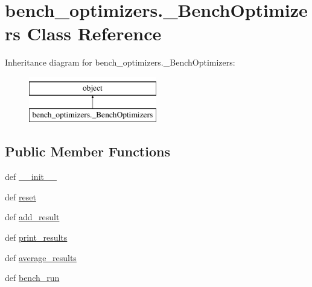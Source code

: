 \hypertarget{classbench__optimizers_1_1__BenchOptimizers}{}\section{bench\+\_\+optimizers.\+\_\+\+Bench\+Optimizers Class Reference}
\label{classbench__optimizers_1_1__BenchOptimizers}
Inheritance diagram for bench\+\_\+optimizers.\+\_\+\+Bench\+Optimizers\+:\begin{figure}[H]
\begin{center}
\leavevmode
\includegraphics[height=2.000000cm]{classbench__optimizers_1_1__BenchOptimizers}
\end{center}
\end{figure}
\subsection*{Public Member Functions}
\begin{DoxyCompactItemize}
\item 
def \hyperlink{classbench__optimizers_1_1__BenchOptimizers_a0741b148516ba806effabfe4e407b179}{\+\_\+\+\_\+init\+\_\+\+\_\+}
\item 
def \hyperlink{classbench__optimizers_1_1__BenchOptimizers_a414c608ec5a23601cc181b00508daf67}{reset}
\item 
def \hyperlink{classbench__optimizers_1_1__BenchOptimizers_af8664f9651000004fd871a561df27a6b}{add\+\_\+result}
\item 
def \hyperlink{classbench__optimizers_1_1__BenchOptimizers_ac75caed00bf31de5472bb794b454f56a}{print\+\_\+results}
\item 
def \hyperlink{classbench__optimizers_1_1__BenchOptimizers_a606cc1245ad7bbfb52ea36e5a4cd2800}{average\+\_\+results}
\item 
def \hyperlink{classbench__optimizers_1_1__BenchOptimizers_aa2aae214890f73cf0ba6e61f16144dbb}{bench\+\_\+run}
\end{DoxyCompactItemize}
